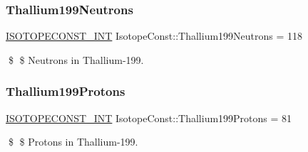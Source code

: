 \subsubsection{\texorpdfstring{Thallium199\+Neutrons}{Thallium199Neutrons}}
{\footnotesize\ttfamily \mbox{\hyperlink{group___isotope_const-_macros_ga5f18360b3e99483a35c32d789e62621c}{I\+S\+O\+T\+O\+P\+E\+C\+O\+N\+S\+T\+\_\+\+I\+NT}} Isotope\+Const\+::\+Thallium199\+Neutrons = 118}

\$ \$ Neutrons in Thallium-\/199. \mbox{\label{group___isotope_const-_thallium-_tl199_ga1e984e1e973d80a9e95a2b27ed3bb9a4}} 
\subsubsection{\texorpdfstring{Thallium199\+Protons}{Thallium199Protons}}
{\footnotesize\ttfamily \mbox{\hyperlink{group___isotope_const-_macros_ga5f18360b3e99483a35c32d789e62621c}{I\+S\+O\+T\+O\+P\+E\+C\+O\+N\+S\+T\+\_\+\+I\+NT}} Isotope\+Const\+::\+Thallium199\+Protons = 81}

\$ \$ Protons in Thallium-\/199. 